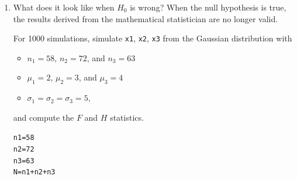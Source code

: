 \documentclass{article}\usepackage[]{graphicx}\usepackage[]{xcolor}
\makeatletter
\newcommand{\hlnum}[1]{\textcolor[rgb]{0.686,0.059,0.569}{#1}}%
\newcommand{\hlopt}[1]{\textcolor[rgb]{0,0,0}{#1}}%
\newcommand{\hldef}[1]{\textcolor[rgb]{0.345,0.345,0.345}{#1}}%
\newcommand{\hlkwb}[1]{\textcolor[rgb]{0.69,0.353,0.396}{#1}}%
\newcommand{\hlkwd}[1]{\textcolor[rgb]{0.737,0.353,0.396}{\textbf{#1}}}%
\newenvironment{kframe}{%
 \def\at@end@of@kframe{}%
 \ifinner\ifhmode%
  \def\at@end@of@kframe{\end{minipage}}%
  \begin{minipage}{\columnwidth}%
 \fi\fi%
 \def\FrameCommand##1{\hskip\@totalleftmargin \hskip-\fboxsep
 \colorbox{shadecolor}{##1}\hskip-\fboxsep
     \hskip-\linewidth \hskip-\@totalleftmargin \hskip\columnwidth}%
 \MakeFramed {\advance\hsize-\width
   \@totalleftmargin\z@ \linewidth\hsize
   \@setminipage}}%
 {\par\unskip\endMakeFramed%
 \at@end@of@kframe}
\newenvironment{knitrout}{}{} %
\makeatother
\begin{document}
\begin{enumerate}
\begin{enumerate}
\begin{knitrout}\scriptsize
{}\color{fgcolor}\begin{kframe}
\begin{alltt}
\hldef{(type1_error_F_lap} \hlkwb{<-} \hlkwd{mean}\hldef{(F.stat_lap} \hlopt{>=} \hldef{rejection_point_F))}
\end{alltt}
\begin{verbatim}
## [1] 0.046
\end{verbatim}
\begin{alltt}
\hldef{(type1_error_H_lap} \hlkwb{<-} \hlkwd{mean}\hldef{(H.stat_lap} \hlopt{>=} \hldef{rejection_point_H))}
\end{alltt}
\begin{verbatim}
## [1] 0.052
\end{verbatim}
\end{kframe}
\end{knitrout}

\textcolor{red}{Even when the data is not normally distributed, both tests are fairly robust. The Distributions follow the histograms almost as close and the type I errors are within 0.01 of the normally distributed errors.}


\end{enumerate} 
\item \textrm{What does it look like when $H_0$ is wrong?} When the null 
hypothesis is true, the results derived from the mathematical statistician
are no longer valid. 

For 1000 simulations, simulate \texttt{x1}, \texttt{x2}, \texttt{x3} from the 
Gaussian distribution with 
\begin{itemize}
\item $n_1=58$, $n_2=72$, and $n_3=63$
\item $\mu_1=2$, $\mu_2=3$, and $\mu_3=4$
\item $\sigma_1=\sigma_2=\sigma_3=5$,
\end{itemize}
and compute the $F$ and $H$ statistics.

\begin{knitrout}\scriptsize
{}\color{fgcolor}\begin{kframe}
\begin{alltt}
\hldef{n1} \hlkwb{=} \hlnum{58}
\hldef{n2} \hlkwb{=} \hlnum{72}
\hldef{n3} \hlkwb{=} \hlnum{63}
\hldef{N} \hlkwb{=} \hldef{n1} \hlopt{+} \hldef{n2} \hlopt{+} \hldef{n3}


\end{alltt}
\end{kframe}
\end{knitrout}
\end{enumerate}
\end{document}
